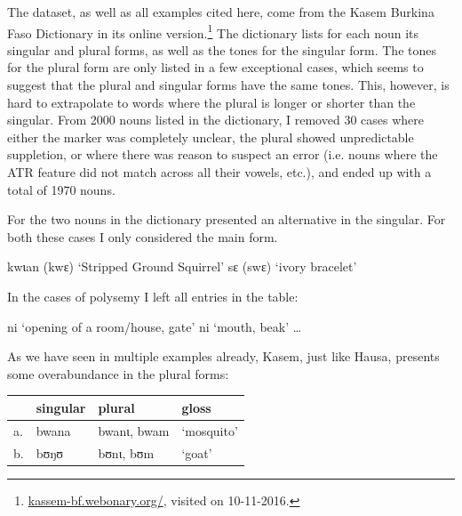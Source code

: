 The dataset, as well as all examples cited here, come from the Kasem Burkina Faso Dictionary \autocite{Niggli.2016} in its online version.\footnote{\url{kassem-bf.webonary.org/}, visited on 10-11-2016.} The dictionary lists for each noun its singular and plural forms, as well as the tones for the singular form. The tones for the plural form are only listed in a few exceptional cases, which seems to suggest that the plural and singular forms have the same tones. This, however, is hard to extrapolate to words where the plural is longer or shorter than the singular. From 2000 nouns listed in the dictionary, I removed 30 cases where either the marker was completely unclear, the plural showed unpredictable suppletion, or where there was reason to suspect an error (i.e. nouns where the ATR feature did not match across all their vowels, etc.), and ended up with a total of 1970 nouns.

For the two nouns in  the dictionary presented an alternative in the singular. For both these cases I only considered the main form.

\begin{exe}
    \ex \label{kasem-alt-sing}
    \begin{xlist}
        \ex kwɩan (kwɛ)  `Stripped Ground Squirrel'
        \ex sɛ (swɛ)  `ivory bracelet'
    \end{xlist}
\end{exe}

In the cases of polysemy I left all entries in the table:

\begin{exe}
    \ex \label{kasem-syn}
    \begin{xlist}
        \ex ni `opening of a room/house, gate'
        \ex ni `mouth, beak'
        \ex \dots
    \end{xlist}
\end{exe}

As we have seen in multiple examples already, Kasem, just like Hausa, presents some overabundance in the plural forms:

\begin{exe}
    \ex \label{kasem-over-pl}
    \begin{tabular}[t]{llll}
      & singular & plural      & gloss      \\
      \midrule
      a. & bwana    & bwanɩ, bwam & `mosquito' \\
      b. & bʊŋʊ     & bʊnɩ, bʊm   & `goat'     \\
    \end{tabular}
\end{exe}

